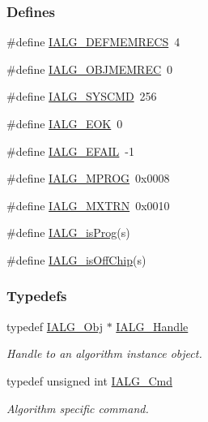\subsubsection*{Defines}
\begin{CompactItemize}
\item 
\#define \hyperlink{group__ti__xdais___i_a_l_g_g8a220fa863380937542f6a38be47ceda}{IALG\_\-DEFMEMRECS}~4
\item 
\#define \hyperlink{group__ti__xdais___i_a_l_g_g0e3202a4d8dc0bd3cb300633922ffd54}{IALG\_\-OBJMEMREC}~0
\item 
\#define \hyperlink{group__ti__xdais___i_a_l_g_g200f155f9e2720011270e99f17bb6675}{IALG\_\-SYSCMD}~256
\item 
\#define \hyperlink{group__ti__xdais___i_a_l_g_g2c15898121a23a164e4ea2bcc4f7e7dc}{IALG\_\-EOK}~0
\item 
\#define \hyperlink{group__ti__xdais___i_a_l_g_g604e5600815cbd58846e0c5c05b6ba18}{IALG\_\-EFAIL}~-1
\item 
\#define \hyperlink{group__ti__xdais___i_a_l_g_g86018453b8f991c8cb545b2e43c80c9c}{IALG\_\-MPROG}~0x0008
\item 
\#define \hyperlink{group__ti__xdais___i_a_l_g_gfc53b940e2982a2e859bda0555180eb7}{IALG\_\-MXTRN}~0x0010
\item 
\#define \hyperlink{group__ti__xdais___i_a_l_g_g93e8704d8e88d2f3dde1a85317232b59}{IALG\_\-is\-Prog}(s)
\item 
\#define \hyperlink{group__ti__xdais___i_a_l_g_ge2530ce6b07542f579871961a3fcfd4f}{IALG\_\-is\-Off\-Chip}(s)
\end{CompactItemize}
\subsubsection*{Typedefs}
\begin{CompactItemize}
\item 
typedef \hyperlink{struct_i_a_l_g___obj}{IALG\_\-Obj} $\ast$ \hyperlink{group__ti__xdais___i_a_l_g_g16c037803ea218ba3dc5158f55ef27c0}{IALG\_\-Handle}
\begin{CompactList}\small\item\em Handle to an algorithm instance object. \item\end{CompactList}\item 
typedef unsigned int \hyperlink{group__ti__xdais___i_a_l_g_g9032f20923ef2ba1d6b88c87a20075fa}{IALG\_\-Cmd}
\begin{CompactList}\small\item\em Algorithm specific command. \item\end{CompactList}\end{CompactItemize}
